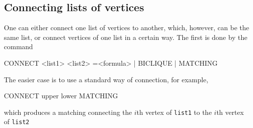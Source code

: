 \subsection{Connecting lists of vertices}

One can either connect one list of vertices to another, which, however, can be the same list, or connect vertices of one list in a certain way. The first is done by the command

\begin{tcolorbox}[colback=lightpink]
  CONNECT <list1> <list2> =<formula> | BICLIQUE | MATCHING
\end{tcolorbox}

The easier case is to use a standard way of connection, for example,

\begin{tcolorbox}[colback=palegreen]
  CONNECT upper lower MATCHING
\end{tcolorbox}
which produces a matching connecting the $i$th vertex of
\texttt{list1} to the $i$th vertex of \texttt{list2}

